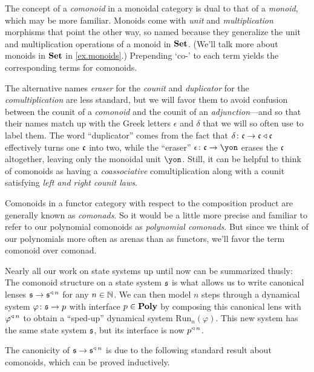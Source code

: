 \documentclass[Book-Poly]{subfiles}
\begin{document}
\begin{remark}
The concept of a \emph{comonoid} in a monoidal category is dual to that of a \emph{monoid}, which may be more familiar.
Monoids come with \emph{unit} and \emph{multiplication} morphisms that point the other way, so named because they generalize the unit and multiplication operations of a monoid in $\mathbf{Set}$.
(We'll talk more about monoids in $\mathbf{Set}$ in \cref{ex.monoids}.)
Prepending `co-' to each term yields the corresponding terms for comonoids.

The alternative names \emph{eraser} for the \emph{counit} and \emph{duplicator} for the \emph{comultiplication} are less standard, but we will favor them to avoid confusion between the counit of a \emph{comonoid} and the counit of an \emph{adjunction}---and so that their names match up with the Greek letters $\epsilon$ and $\delta$ that we will so often use to label them.
The word ``duplicator'' comes from the fact that $\delta\colon\mathfrak{c}\to\mathfrak{c}\mathbin{\triangleleft}\mathfrak{c}$ effectively turns one $\mathfrak{c}$ into two, while the ``eraser'' $\epsilon\colon\car{c}\to\yon$ erases the $\mathfrak{c}$ altogether, leaving only the monoidal unit $\yon$.
Still, it can be helpful to think of comonoids as having a \emph{coassociative} comultiplication along with a counit satisfying \emph{left and right counit laws}.
\end{remark}

\begin{remark}
Comonoids in a functor category with respect to the composition product are generally known as \emph{comonads}.
So it would be a little more precise and familiar to refer to our polynomial comonoids as \emph{polynomial comonads}.
But since we think of our polynomials more often as arenas than as functors, we’ll favor the term comonoid over comonad.
\end{remark}

\begin{example}
Nearly all our work on state systems up until now can be summarized thusly:
The comonoid structure on a state system $\mathfrak{s}$ is what allows us to write canonical lenses $\mathfrak{s}\to\mathfrak{s}^{\mathbin{\triangleleft}\,n}$ for any $n\in\mathbb{N}$.
We can then model $n$ steps through a dynamical system $\varphi\colon\mathfrak{s}\to p$ with interface $p\in\mathbf{Poly}$ by composing this canonical lens with $\varphi^{\mathbin{\triangleleft}\,n}$ to obtain a ``sped-up'' dynamical system $\text{Run}_n(\varphi)$.
This new system has the same state system $\mathfrak{s}$, but its interface is now $p^{\mathbin{\triangleleft}\,n}$.

The canonicity of $\mathfrak{s}\to\mathfrak{s}^{\mathbin{\triangleleft}\,n}$ is due to the following standard result about comonoids, which can be proved inductively. %
\end{example}
\end{document}
